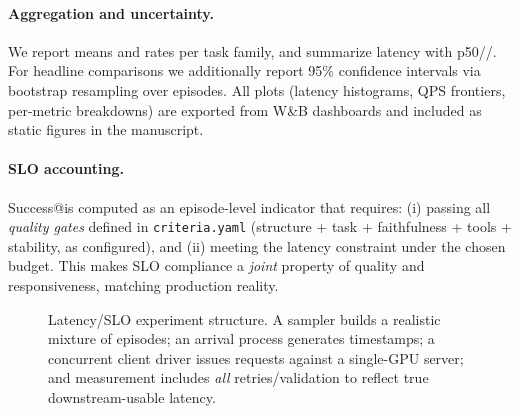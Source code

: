 \paragraph{Aggregation and uncertainty.}
We report means and rates per task family, and summarize latency with p50/\pninetyfive/\pninetynine.
For headline comparisons we additionally report 95\% confidence intervals via bootstrap resampling over episodes.
All plots (latency histograms, QPS frontiers, per-metric breakdowns) are exported from W\&B dashboards and included as static figures in the manuscript.

\paragraph{SLO accounting.}
Success@\slo is computed as an episode-level indicator that requires:
(i) passing all \emph{quality gates} defined in \texttt{criteria.yaml} (structure + task + faithfulness + tools + stability, as configured), and
(ii) meeting the latency constraint under the chosen budget.
This makes SLO compliance a \emph{joint} property of quality and responsiveness, matching production reality.

\begin{figure}[t]
\centering
{}
\caption{Latency/SLO experiment structure.
A sampler builds a realistic mixture of episodes; an arrival process generates timestamps; a concurrent client driver issues requests against a single-GPU server; and measurement includes \emph{all} retries/validation to reflect true downstream-usable latency.}
\label{fig:slo-harness}
\end{figure}

